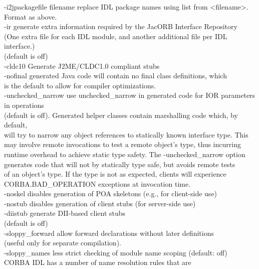 \begin{tabbing}
\> -i2jpackagefile filename \> replace IDL package names using list
from <filename>. \\
\> \> Format as above.\\
\> -ir \> generate extra information required by the JacORB Interface
Repository \\
\> \> (One extra file for each IDL module, and another additional file per IDL interface.)\\
\> \> (default is off)\\
\> -cldc10 \>Generate J2ME/CLDC1.0 compliant stubs\\
\> -nofinal  \> generated Java code will contain no final class
definitions, which\\
\> \> is the default to allow for compiler optimizations.\\
\> -unchecked\_narrow  \>  use unchecked\_narrow in generated code for IOR parameters in
 operations \\
\> \> (default is off). Generated helper classes contain marshalling code which, by
default,\\
\> \>  will try to narrow any object references to statically known interface type. This \\
\> \> may involve remote invocations to test a remote object's type, thus incurring \\
\> \> runtime overhead to achieve static type safety. The -unchecked\_narrow option\\
\> \> generates code that will not by statically type safe, but avoids
remote tests \\
\> \>  of an object's type. If the type is not as expected, clients will experience \\
\> \> CORBA.BAD\_OPERATION exceptions at invocation time.\\
\> -noskel \>disables generation of POA skeletons (e.g., for
client-side use)\\
\> -nostub \>disables generation of client stubs (for server-side use)\\
\> -diistub \>generate DII-based client stubs \\
\> \> (default is off)\\
\> -sloppy\_forward \> allow forward declarations without later
definitions\\
\> \> (useful only for separate compilation).\\
\> -sloppy\_names \> less strict checking of module name scoping
(default: off)\\
\> \> CORBA IDL has a number of  name resolution rules that are

\end{tabbing}

